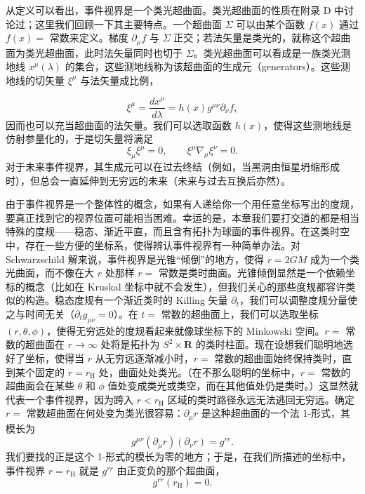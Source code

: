 从定义可以看出，事件视界是一个类光超曲面。类光超曲面的性质在附录 D 中讨论过；这里我们回顾一下其主要特点。一个超曲面 $\Sigma$ 可以由某个函数 $f(x)$ 通过 $f(x)=$ 常数来定义。梯度 $\partial_\mu f$ 与 $\Sigma$ 正交；若法矢量是类光的，就称这个超曲面为类光超曲面，此时法矢量同时也切于 $\Sigma$。类光超曲面可以看成是一族类光测地线 $x^{\mu}(\lambda)$ 的集合，这些测地线称为该超曲面的生成元（generators）。这些测地线的切矢量 $\xi^{\mu}$ 与法矢量成比例，

\begin{equation*}
\xi^\mu = \frac{dx^\mu}{d\lambda} = h(x)g^{\mu\nu}\partial_\nu f,
\tag{6.1}
\end{equation*}
因而也可以充当超曲面的法矢量。我们可以选取函数 $h(x)$，使得这些测地线是仿射参量化的，于是切矢量将满足
\begin{equation*}
\xi_\mu\xi^\mu = 0, \qquad \xi^\mu\nabla_\mu\xi^\nu = 0.
\tag{6.2}
\end{equation*}
对于未来事件视界，其生成元可以在过去终结（例如，当黑洞由恒星坍缩形成时），但总会一直延伸到无穷远的未来（未来与过去互换后亦然）。

由于事件视界是一个整体性的概念，如果有人递给你一个用任意坐标写出的度规，要真正找到它的视界位置可能相当困难。幸运的是，本章我们要打交道的都是相当特殊的度规——稳态、渐近平直，而且含有拓扑为球面的事件视界。在这类时空中，存在一些方便的坐标系，使得辨认事件视界有一种简单办法。对 Schwarzschild 解来说，事件视界是光锥“倾倒”的地方，使得 $r=2GM$ 成为一个类光曲面，而不像在大 $r$ 处那样 $r=$ 常数是类时曲面。光锥倾倒显然是一个依赖坐标的概念（比如在 Kruskal 坐标中就不会发生），但我们关心的那些度规都容许类似的构造。稳态度规有一个渐近类时的 Killing 矢量 $\partial_t$，我们可以调整度规分量使之与时间无关（$\partial_t g_{\mu\nu}=0$）。在 $t=$ 常数的超曲面上，我们可以选取坐标 $(r,\theta,\phi)$，使得无穷远处的度规看起来就像球坐标下的 Minkowski 空间。$r=$ 常数的超曲面在 $r\to\infty$ 处将是拓扑为 $S^{2}\times\mathbf{R}$ 的类时柱面。现在设想我们聪明地选好了坐标，使得当 $r$ 从无穷远逐渐减小时，$r=$ 常数的超曲面始终保持类时，直到某个固定的 $r=r_{\mathrm{H}}$ 处，曲面处处类光。（在不那么聪明的坐标中，$r=$ 常数的超曲面会在某些 $\theta$ 和 $\phi$ 值处变成类光或类空，而在其他值处仍是类时。）这显然就代表一个事件视界，因为跨入 $r<r_{\mathrm{H}}$ 区域的类时路径永远无法逃回无穷远。确定 $r=$ 常数超曲面在何处变为类光很容易：$\partial_\mu r$ 是这种超曲面的一个法 1-形式，其模长为
\begin{equation*}
g^{\mu\nu}(\partial_\mu r)(\partial_\nu r) = g^{rr}.
\tag{6.3}
\end{equation*}
我们要找的正是这个 1-形式的模长为零的地方；于是，在我们所描述的坐标中，事件视界 $r=r_{\mathrm{H}}$ 就是 $g^{rr}$ 由正变负的那个超曲面，
\begin{equation*}
g^{rr}(r_{\mathrm{H}}) = 0.
\tag{6.4}
\end{equation*}

